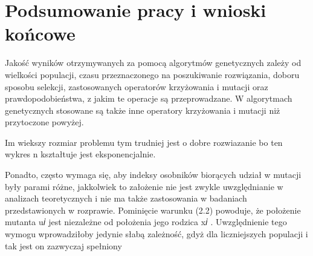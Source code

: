 \chapter{Podsumowanie pracy i wnioski końcowe}\label{cha:pierwszyDokument}

Jakość wyników otrzymywanych za pomocą algorytmów genetycznych zależy
od wielkości populacji, czasu przeznaczonego na poszukiwanie rozwiązania, doboru
sposobu selekcji, zastosowanych operatorów krzyżowania i mutacji oraz prawdopodobieństwa, z jakim te operacje są przeprowadzane. W algorytmach genetycznych
stosowane są także inne operatory krzyżowania i mutacji niż przytoczone powyżej. \\
\par
Im wiekszy rozmiar problemu tym trudniej jest o dobre rozwiazanie bo ten wykres n kształtuje jest eksponencjalnie.\\
\par
 Ponadto,
często wymaga się, aby indeksy osobników biorących udział w mutacji były parami
różne, jakkolwiek to założenie nie jest zwykle uwzględnianie w analizach teoretycznych
i nie ma także zastosowania w badaniach przedstawionych w rozprawie. Pominięcie
warunku (2.2) powoduje, że położenie mutanta u𝑖
jest niezależne od położenia jego
rodzica x𝑖
. Uwzględnienie tego wymogu wprowadziłoby jedynie słabą zależność,
gdyż dla liczniejszych populacji i tak jest on zazwyczaj spełniony